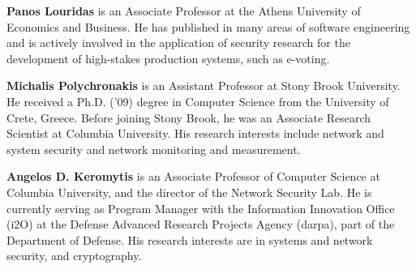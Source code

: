 \documentclass[10pt,journal,compsoc]{IEEEtran}
\begin{document}
\noindent
{\bf Panos Louridas} is an Associate Professor at
the Athens University of Economics and Business.
He has published in many areas of software engineering
and is actively involved in the application of security
research for the development of high-stakes production
systems, such as e-voting.

\noindent
{\bf Michalis Polychronakis} is an Assistant Professor
at Stony Brook University.
He received a Ph.D. ('09)
degree in Computer Science from the University of Crete, Greece.
Before joining Stony Brook, he was an Associate Research
Scientist at Columbia University.
His research interests include
network and system security and network monitoring and measurement.

\noindent
{\bf Angelos D. Keromytis} is an Associate Professor
of Computer Science at Columbia University,
and the director of the Network Security Lab.
He is currently serving as  Program Manager with the
Information Innovation Office ({\sc i}2O) at the Defense Advanced
Research Projects Agency ({\sc darpa}),
part of the Department of Defense.
His research interests are in systems
and network security,
and cryptography.
\end{document}
